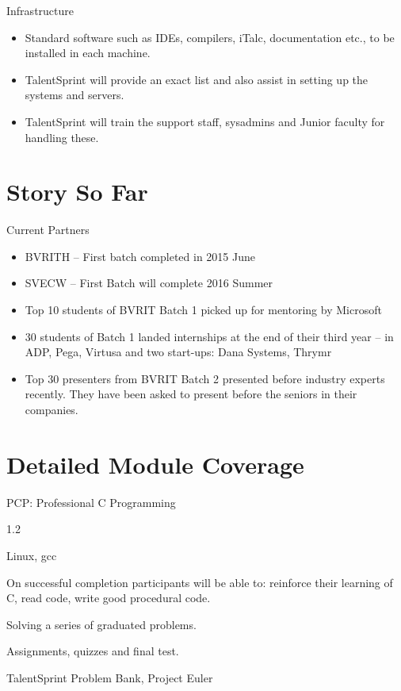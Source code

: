 \documentclass[12pt]{beamer}
\begin{document}
{\begin{frame}{Infrastructure}
\begin{itemize} 
  \item Standard software such as IDEs, compilers, iTalc, documentation etc., to be installed in each machine.
    \item TalentSprint will provide an exact list and also assist in setting up the systems and servers. 
    \item TalentSprint will train the support staff, sysadmins and Junior faculty for handling these.
  \end{itemize}
\end{frame}

\section{Story So Far}
\begin{frame}{Current Partners}
	\begin{itemize}
		\item BVRITH -- First batch completed in 2015 June
		\item SVECW -- First Batch will complete 2016 Summer
		\item Top 10 students of BVRIT Batch 1 picked up for mentoring by Microsoft
		\item 30 students of Batch 1 landed internships at the end of their third year -- in ADP, Pega, Virtusa and two start-ups: Dana Systems, Thrymr
		\item Top 30 presenters from BVRIT Batch 2 presented before industry experts recently. They have been asked to present before the seniors in their companies.
	\end{itemize}
\end{frame}

\section{Detailed Module Coverage}
\begin{frame}{PCP: Professional C Programming}
  \begin{description}[Resource(S)]
  \item[Slot] 1.2 
  \item[Platform] Linux, gcc
  \item[Objectives] On successful completion participants will be able to: reinforce their learning of C, read code, write good procedural code.
  \item[Pedagogy] Solving a series of graduated problems.
  \item[Assessment] Assignments, quizzes and final test.
  \item[Resource(s)] TalentSprint Problem Bank, Project Euler
  \end{description}
\end{frame}

}
\end{document}
